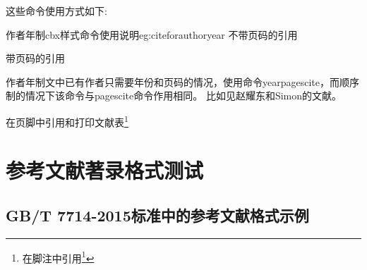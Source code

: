 这些命令使用方式如下:

\begin{codetex}{作者年制cbx样式命令使用说明}{eg:citeforauthoryear}
不带页码的引用\cite{Peebles2001-100-100}\parencite{Miroslav2004--}

带页码的引用\cite[见][49页]{蔡敏2006--}\parencite[见][49页]{Miroslav2004--}

作者年制文中已有作者只需要年份和页码的情况，使用命令yearpagescite，而顺序制的情况下该命令与pagescite命令作用相同。
比如见赵耀东和Simon的文献。

在页脚中引用和打印文献表\footnote{在脚注中引用\footcite{赵学功2001--}}
\end{codetex}


\section{参考文献著录格式测试}

\subsection{GB/T 7714-2015标准中的参考文献格式示例}\label{sec:eg:gb77142015}

